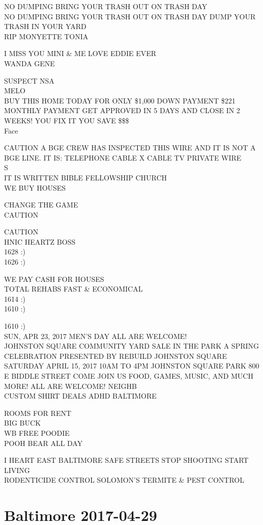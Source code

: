\documentclass[10pt,letterpaper]{article}
\begin{document}
NO DUMPING BRING YOUR TRASH OUT ON TRASH DAY\\
NO DUMPING BRING YOUR TRASH OUT ON TRASH DAY DUMP YOUR TRASH IN YOUR YARD\\
RIP MONYETTE TONIA

I MISS YOU MINI \& ME LOVE EDDIE EVER\\
WANDA GENE

SUSPECT NSA\\
MELO\\
BUY THIS HOME TODAY FOR ONLY \$1,000 DOWN PAYMENT \$221 MONTHLY PAYMENT GET APPROVED IN 5 DAYS AND CLOSE IN 2 WEEKS!  YOU FIX IT YOU SAVE \$\$\$\\
Face

CAUTION A BGE CREW HAS INSPECTED THIS WIRE AND IT IS NOT A BGE LINE.  IT IS: TELEPHONE CABLE X CABLE TV PRIVATE WIRE\\
S\\
IT IS WRITTEN BIBLE FELLOWSHIP CHURCH\\
WE BUY HOUSES

CHANGE THE GAME\\
CAUTION

CAUTION\\
HNIC HEARTZ BOSS\\
1628 :)\\
1626 :)

WE PAY CASH FOR HOUSES\\
TOTAL REHABS FAST \& ECONOMICAL\\
1614 :)\\
1610 :)

1610 :)\\
SUN, APR 23, 2017 MEN'S DAY ALL ARE WELCOME!\\
JOHNSTON SQUARE COMMUNITY YARD SALE IN THE PARK A SPRING CELEBRATION PRESENTED BY REBUILD JOHNSTON SQUARE SATURDAY APRIL 15, 2017 10AM TO 4PM JOHNSTON SQUARE PARK 800 E BIDDLE STREET COME JOIN US FOOD, GAMES, MUSIC, AND MUCH MORE! ALL ARE WELCOME!  NEIGHB\\
CUSTOM SHIRT DEALS ADHD BALTIMORE

ROOMS FOR RENT\\
BIG BUCK\\
WB FREE POODIE\\
POOH BEAR ALL DAY

I HEART EAST BALTIMORE SAFE STREETS STOP SHOOTING START LIVING\\
RODENTICIDE CONTROL SOLOMON'S TERMITE \& PEST CONTROL
\

\section*{Baltimore 2017-04-29}
\end{document}
